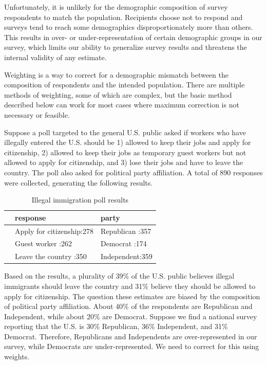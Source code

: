 \documentclass[
]{book}
\begin{document}
Unfortunately, it is unlikely for the demographic composition of survey respondents to match the population. Recipients choose not to respond and surveys tend to reach some demographics disproportionately more than others. This results in over- or under-representation of certain demographic groups in our survey, which limits our ability to generalize survey results and threatens the internal validity of any estimate.

Weighting is a way to correct for a demographic mismatch between the composition of respondents and the intended population. There are multiple methods of weighting, some of which are complex, but the basic method described below can work for most cases where maximum correction is not necessary or feasible.

Suppose a poll targeted to the general U.S. public asked if workers who have illegally entered the U.S. should be 1) allowed to keep their jobs and apply for citizenship, 2) allowed to keep their jobs as temporary guest workers but not allowed to apply for citizenship, and 3) lose their jobs and have to leave the country. The poll also asked for political party affiliation. A total of 890 responses were collected, generating the following results.

\begin{table}

\caption{\label{tab:unnamed-chunk-268}Illegal immigration poll results}
\centering
\begin{tabular}[t]{l|l|l}
\hline
  &                  response &         party\\
\hline
 & Apply for citizenship:278 & Republican :357\\
\hline
 & Guest worker         :262 & Democrat   :174\\
\hline
 & Leave the country    :350 & Independent:359\\
\hline
\end{tabular}
\end{table}

Based on the results, a plurality of 39\% of the U.S. public believes illegal immigrants should leave the country and 31\% believe they should be allowed to apply for citizenship. The question these estimates are biased by the composition of political party affiliation. About 40\% of the respondents are Republican and Independent, while about 20\% are Democrat. Suppose we find a national survey reporting that the U.S. is 30\% Republican, 36\% Independent, and 31\% Democrat. Therefore, Republicans and Independents are over-represented in our survey, while Democrats are under-represented. We need to correct for this using weights.
\end{document}
